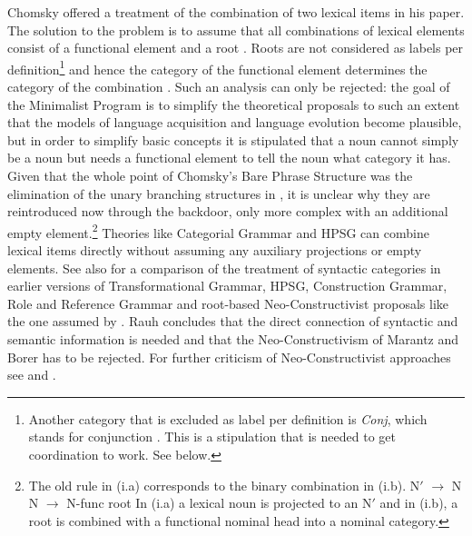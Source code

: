 Chomsky offered a treatment of the combination of two lexical items
in his \citeyear{Chomsky2013a} paper. The solution to the problem is to assume that all combinations of
lexical elements consist of a functional element and a root \citep{Marantz97a,Borer2005a-u}. Roots are not considered as labels per definition\footnote{%
  Another category that is excluded as label per definition is \emph{Conj}, which stands for
  conjunction \citep[--46]{Chomsky2013a}. This is a stipulation that is needed to get
  coordination to work. See below.
} and hence the category of the functional element
determines the category of the combination \citep[]{Chomsky2013a}. 
Such an analysis can only be rejected: the goal of the Minimalist Program is to simplify the
theoretical proposals to such an extent that the models of language acquisition and language evolution
become plausible, but in order to simplify basic concepts it is stipulated that a noun cannot simply
be a noun but needs a functional element to tell the noun what category it has. Given that the whole
point of Chomsky's Bare Phrase Structure \citep{Chomsky95b-u} was the elimination of the unary branching structures
in \xbart, it is unclear why they are reintroduced now through the backdoor, only more complex with
an additional empty element.\footnote{%
   The old \xbar rule in (i.a) corresponds to the binary combination in (i.b).
\eal
\ex N$'$ $\to$ N
\ex N $\to$ N-func root 
\zl
In (i.a) a lexical noun is projected to an N$'$ and in (i.b), a root is combined with a functional
nominal head into a nominal category.
}
Theories like Categorial Grammar and HPSG can combine lexical items directly without assuming
any auxiliary projections or empty elements. See also
 for a comparison of the
treatment of syntactic categories in earlier versions of Transformational Grammar, HPSG\indexhpsg,
Construction Grammar\indexcxg, Role and Reference Grammar and root-based Neo-Constructivist proposals like the one assumed
by \citet{Chomsky2013a}. Rauh concludes that the direct connection of syntactic and semantic
information is needed and that the Neo-Constructivism of Marantz and Borer has to be rejected. For
further criticism of Neo-Constructivist approaches see  and .


